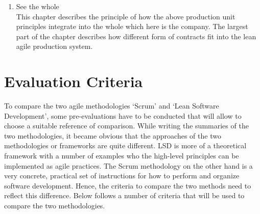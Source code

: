 \documentclass[a4paper,11pt,twoside]{article}
\begin{document}
\begin{enumerate}
\item See the whole\\
This chapter describes the principle of how the above production unit principles integrate into the whole which here is the company. The largest part of the chapter describes how different form of contracts fit into the lean agile production system. 

\end{enumerate} 

\section{Evaluation Criteria}
To compare the two agile methodologies `Scrum' and `Lean Software Development', some pre-evaluations have to be conducted that will allow to choose a suitable reference of comparison. While writing the summaries of the two methodologies, it became obvious that the approaches of the two methodologies or frameworks are quite different. LSD is more of a theoretical framework with a number of examples who the high-level principles can be implemented as agile practices. The Scrum methodology on the other hand is a very concrete, practical set of instructions for how to perform and organize software development.
Hence, the criteria to compare the two methods need to reflect this difference. Below follows a number of criteria that will be used to compare the two methodologies.
\end{document}
